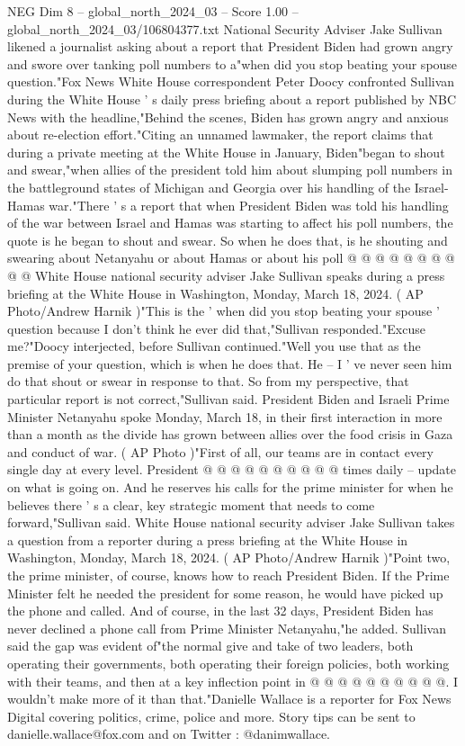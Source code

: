 \begin{textsample}{NEG Dim 8 – global\_north\_2024\_03 – Score 1.00 – global\_north\_2024\_03/106804377.txt}  \label{ex:f8_neg_447}
National Security Adviser Jake Sullivan likened a journalist asking about a report that President Biden had grown angry and swore over tanking poll numbers to a"when did you stop beating your spouse question."Fox News White House correspondent Peter Doocy confronted Sullivan during the White House ' s daily press briefing about a report published by NBC News with the headline,"Behind the scenes, Biden has grown angry and anxious about re-election effort."Citing an unnamed lawmaker, the report claims that during a private meeting at the White House in January, Biden"began to shout and swear,"when allies of the president told him about slumping poll numbers in the battleground states of Michigan and Georgia over his handling of the Israel-Hamas war."There ' s a report that when President Biden was told his handling of the war between Israel and Hamas was starting to affect his poll numbers, the quote is he began to shout and swear.
So when he does that, is he shouting and swearing about Netanyahu or about Hamas or about his poll @ @ @ @ @ @ @ @ @ @ White House national security adviser Jake Sullivan speaks during a press briefing at the White House in Washington, Monday, March 18, 2024. ( AP Photo/Andrew Harnik )"This is the ' when did you stop beating your spouse ' question because I don't think he ever did that,"Sullivan responded."Excuse me?"Doocy interjected, before Sullivan continued."Well you use that as the premise of your question, which is when he does that.
He -- I ' ve never seen him do that shout or swear in response to that.
So from my perspective, that particular report is not correct,"Sullivan said.
President Biden and Israeli Prime Minister Netanyahu spoke Monday, March 18, in their first interaction in more than a month as the divide has grown between allies over the food crisis in Gaza and conduct of war. ( AP Photo )"First of all, our teams are in contact every single day at every level.
President @ @ @ @ @ @ @ @ @ @ times daily -- update on what is going on.
And he reserves his calls for the prime minister for when he believes there ' s a clear, key strategic moment that needs to come forward,"Sullivan said.
White House national security adviser Jake Sullivan takes a question from a reporter during a press briefing at the White House in Washington, Monday, March 18, 2024. ( AP Photo/Andrew Harnik )"Point two, the prime minister, of course, knows how to reach President Biden.
If the Prime Minister felt he needed the president for some reason, he would have picked up the phone and called.
And of course, in the last 32 days, President Biden has never declined a phone call from Prime Minister Netanyahu,"he added.
Sullivan said the gap was evident of"the normal give and take of two leaders, both operating their governments, both operating their foreign policies, both working with their teams, and then at a key inflection point in @ @ @ @ @ @ @ @ @ @.
I wouldn't make more of it than that."Danielle Wallace is a reporter for Fox News Digital covering politics, crime, police and more.
Story tips can be sent to danielle.wallace@fox.com and on Twitter : @danimwallace.

\end{textsample}
